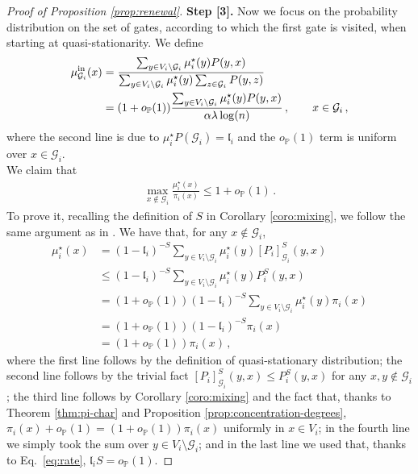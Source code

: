 \documentclass[11pt,oneside]{amsart}
\numberwithin{equation}{section}  %
\theoremstyle{plain}
\newcommand{\p}{\mathbb{P}}
\newcommand{\op}{o_{\p}}
\newcommand{\gates}{\mathcal{G}}
\newcommand{\muinb}{\mu^{\rm in}_{\gates_i}}
\newcommand{\muqs}{\mu^\star_i}
\begin{document}
\begin{proof}[Proof of Proposition \ref{prop:renewal}]
{\bf Step [3].} Now we focus on the probability distribution
on the set of gates, according to which the first gate is visited, when starting at quasi-stationarity. We define
	\begin{equation} \label{eq:muinb}
		\begin{split}
			\muinb(x)&=\frac{\sum_{y\in V_i\setminus \gates_i}\muqs(y)P(y,x)}{\sum_{y\in V_i\setminus \gates_i}\muqs(y)\sum_{z\in \gates_i}P(y,z)}\\
			&=(1+\op(1))\frac{\sum_{y\in V_i\setminus \gates_i}\muqs(y)P(y,x)}{\alpha\lambda\log(n)} \,,\qquad x\in\gates_i\,,
		\end{split}
	\end{equation} 
	where the second line is due to $\mu_i^\star P(\gates_i)=\mathfrak{l}_i$ and the $\op(1)$ term is uniform over $x\in\gates_i$.\\
	We claim that
	\begin{align}
		\max_{x\not\in \gates_i}\frac{\muqs(x)}{\pi_i(x)}\le 1+\op(1)\,.
	\end{align}
	To prove it, recalling the definition of $S$ in Corollary \ref{coro:mixing}, we follow the same argument as in  \cite[Eqs.~5.15--5.19]{MQS}. We have that, for any $x\not\in\gates_{i}$,
	\begin{equation} \begin{split}\label{eq:eq:MQS}
		\muqs(x)&=(1-\mathfrak{l}_i)^{-S}\sum_{y\in V_i\setminus\gates_{i}}\muqs(y)[P_i]_{\gates_{i}}^S(y,x)\\
		&\le(1-\mathfrak{l}_i)^{-S}\sum_{y\in V_i\setminus\gates_{i}}\muqs(y)P_i^S(y,x)\\
		&=(1+\op(1))(1-\mathfrak{l}_i)^{-S}\sum_{y\in V_i\setminus\gates_{i}}\muqs(y)\pi_i(x)\\
		&=(1+\op(1))(1-\mathfrak{l}_i)^{-S}\pi_{i}(x)\\
		&=(1+\op(1))\pi_{i}(x)\,, \end{split}
	\end{equation}
	where the first line follows by the definition of quasi-stationary distribution; the second line follows by the trivial fact $[P_i]_{\gates_{i}}^S(y,x) \le P_i^S(y,x) $ for any $x,y\not\in\gates_{i}$; the third line follows by Corollary \ref{coro:mixing} and the fact that, thanks to Theorem \ref{thm:pi-char} and Proposition \ref{prop:concentration-degrees}, $\pi_i(x)+\op(1)=(1+\op(1))\pi_i(x)$ uniformly in $x\in V_i$; in the fourth line we simply took the sum over $y\in V_i\setminus\gates_{i}$; and in the last line we used that, thanks to Eq.~\eqref{eq:rate}, $\mathfrak{l}_iS=\op(1)$.

\end{proof}
\end{document}
